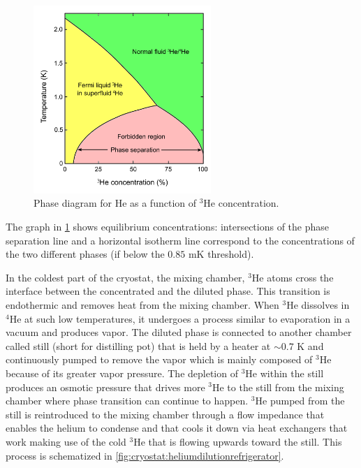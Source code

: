 \begin{figure}[ht]
    \centering
    \includegraphics[width=0.6\textwidth]{Setup-software/figures/Helium_phase_diagram.svg.png}
    \caption{Phase diagram for $\mathrm{He}$ as a function of $\mathrm{^3He}$ concentration.}
    \label{fig:cryostat:heliumphasediagram}
\end{figure}

The graph in \cref{fig:cryostat:heliumphasediagram} shows equilibrium concentrations: intersections of the phase separation line and a horizontal isotherm line correspond to the concentrations of the two different phases (if below the $0.85$ mK threshold).

In the coldest part of the cryostat, the mixing chamber, $\mathrm{^3He}$ atoms cross the interface between the concentrated and the diluted phase.
This transition is endothermic and removes heat from the mixing chamber.
When $\mathrm{^3He}$ dissolves in $\mathrm{^4He}$ at such low temperatures, it undergoes a process similar to evaporation in a vacuum and produces vapor.
The diluted phase is connected to another chamber called still (short for distilling pot) that is held by a heater at $\sim0.7$ K and continuously pumped to remove the vapor which is mainly composed of $\mathrm{^3He}$ because of its greater vapor pressure.
The depletion of $\mathrm{^3He}$ within the still produces an osmotic pressure that drives more $\mathrm{^3He}$ to the still from the mixing chamber where phase transition can continue to happen.
$\mathrm{^3He}$ pumped from the still is reintroduced to the mixing chamber through a flow impedance that enables the helium to condense and that cools it down via heat exchangers that work making use of the cold $\mathrm{^3He}$ that is flowing upwards toward the still. This process is schematized in \cref{fig:cryostat:heliumdilutionrefrigerator}.

